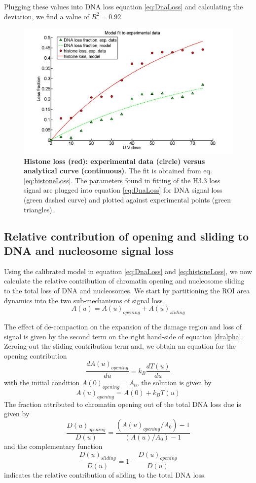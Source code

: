 \documentclass[12pt]{article}
\begin{document}
Plugging these values into DNA loss equation \ref{eq:DnaLoss} and calculating the deviation, we find a value of $R^2=0.92$
\begin{figure}[H]
\centering
\includegraphics[width=0.6\linewidth, height=0.3\textheight]{histoneAndDnaVsUvDoseModelFit}
\caption{\textbf{Histone loss (red): experimental data (circle) versus analytical curve (continuous)}. The fit is obtained from  eq. \ref{eq:histoneLoss}. The parameters found in fitting of the H3.3 loss signal are plugged into equation \ref{eq:DnaLoss} for DNA signal loss (green dashed curve) and plotted against experimental points (green triangles).}
\label{fig:histoneAndDnaVsUvDoseModelFit}
\end{figure}

\subsection{Relative contribution of opening and sliding to DNA and nucleosome signal loss}
Using the calibrated model in equation \ref{eq:DnaLoss} and \ref{eq:histoneLoss}, we now calculate the relative contribution of chromatin opening and nucleosome sliding to the total loss of DNA and nucleosomes.
We start by partitioning the ROI area dynamics into the two sub-mechanisms of signal loss
\begin{equation*}
A(u) = A(u)_{opening}+A(u)_{sliding}
\end{equation*}

The effect of de-compaction on the expansion of the damage region and loss of signal is given by the second term on the right hand-side of equation \ref{dralpha}. Zeroing-out the sliding contribution term and,  we obtain an equation for the opening contribution 
\begin{equation*}
\frac{dA(u)_{opening}}{du}=k_B\frac{dT(u)}{du}
\end{equation*}
with the initial condition $A(0)_{opening}=A_0$, the solution is given by
\begin{equation}
A(u)_{opening}= A(0)+k_BT(u)
\end{equation}
The fraction attributed to chromatin opening out of the total DNA loss due is given by 
\begin{equation}\label{eq:openingContributionDNA}
\frac{D(u)_{opening}}{D(u)}=\frac{\left(A(u)_{opening}/A_0\right)-1}{\left(A(u)/A_0\right) -1}
\end{equation}
and the complementary function 
\begin{equation}\label{eq:slidingContributionDNA}
\frac{D(u)_{sliding}}{D(u)}=1-\frac{D(u)_{opening}}{D(u)}
\end{equation}
indicates the relative contribution of sliding to the total DNA loss. 
\end{document}
